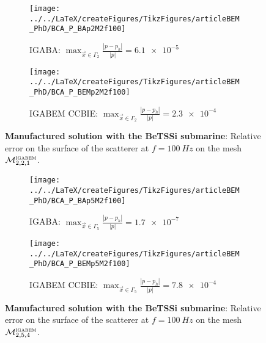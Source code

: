 \begin{figure}
	\centering
	\begin{subfigure}[t]{\textwidth}
		\texttt{[image: ../../LaTeX/createFigures/TikzFigures/articleBEM\_PhD/BCA\_P\_BAp2M2f100]}
		\caption{IGABA: $\displaystyle \max_{\vec{x}\in\Gamma_2}\frac{|p-p_h|}{|p|} = \num{6.1e-5}$}
	\end{subfigure} 
	\par\bigskip
	\begin{subfigure}[t]{\textwidth}
		\texttt{[image: ../../LaTeX/createFigures/TikzFigures/articleBEM\_PhD/BCA\_P\_BEMp2M2f100]}
		\caption{IGABEM CCBIE: $\displaystyle \max_{\vec{x}\in\Gamma_2}\frac{|p-p_h|}{|p|} = \num{2.3e-4}$}
	\end{subfigure} 
	\caption{\textbf{Manufactured solution with the BeTSSi submarine}: Relative error on the surface of the scatterer at $f=\SI{100}{Hz}$ on the mesh ${\cal M}_{2,2,1}^{\textsc{igabem}}$.}
	\label{Fig3:BCA_P_p2M2f100}
\end{figure}


\begin{figure}
	\centering
	\begin{subfigure}[t]{\textwidth}
		\texttt{[image: ../../LaTeX/createFigures/TikzFigures/articleBEM\_PhD/BCA\_P\_BAp5M2f100]}
		\caption{IGABA: $\displaystyle \max_{\vec{x}\in\Gamma_5}\frac{|p-p_h|}{|p|} = \num{1.7e-7}$}
	\end{subfigure} 
	\par\bigskip
	\begin{subfigure}[t]{\textwidth}
		\texttt{[image: ../../LaTeX/createFigures/TikzFigures/articleBEM\_PhD/BCA\_P\_BEMp5M2f100]}
		\caption{IGABEM CCBIE: $\displaystyle \max_{\vec{x}\in\Gamma_5}\frac{|p-p_h|}{|p|} = \num{7.8e-4}$}
	\end{subfigure} 
	\caption{\textbf{Manufactured solution with the BeTSSi submarine}: Relative error on the surface of the scatterer at $f=\SI{100}{Hz}$ on the mesh ${\cal M}_{2,5,4}^{\textsc{igabem}}$.}
	\label{Fig3:BCA_P_p5M2f100}
\end{figure}


